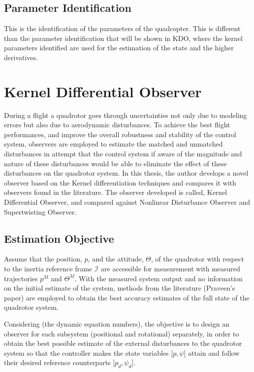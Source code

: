 \documentclass{article}
\begin{document}
\subsection{Parameter Identification}
This is the identification of the parameters of the quadcopter. 
This is different than the parameter identification that will be shown in KDO, where the kernel parameters identified are used for the estimation of the state and the higher derivatives. 

\section{Kernel Differential Observer}
During a flight a quadrotor goes through uncertainties not only due to modeling errors but also due to aerodynamic disturbances. To achieve the best flight performances, and improve the overall robustness and stability of the control system, observers are employed to estimate the matched and unmatched disturbances in attempt that the control system if aware of the magnitude and nature of these disturbances would be able to eliminate the effect of these disturbances on the quadrotor system. In this thesis, the author develops a novel observer based on the Kernel differentiation techniques and compares it with observers found in the literature. The observer developed is called, Kernel Differential Observer, and compared against Nonlinear Disturbance Observer and Supertwisting Observer. 


\subsection{Estimation Objective}
Assume that the position, $p$, and the attitude, $\Theta$, of the quadrotor with respect to the inertia reference frame $\mathcal{I}$ are accessible for measurement with measured trajectories $p^{M}$ and $\Theta^{M}$. 
With the measured system output and no information on the initial estimate of the system, methods from the literature (Praveen's paper) are employed to obtain the best accuracy estimates of the full state of the quadrotor system.

Considering (the dynamic equation numbers), the objective is to design an observer for each subsystem (positional and rotational) separately, in order to obtain the best possible estimate of the external disturbances to the quadrotor system so that the controller makes the state variables [$p,\psi$] attain and follow their desired reference counterparts [$p_d,\psi_d$].
\end{document}
